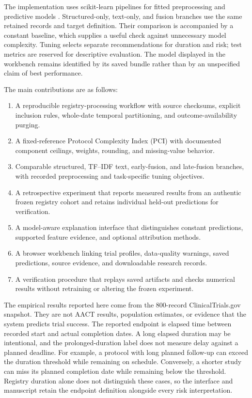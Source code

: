 \documentclass[10pt,letterpaper,twocolumn]{article}
\begin{document}
The implementation uses scikit-learn pipelines for fitted preprocessing and predictive models \cite{sklearn}. Structured-only, text-only, and fusion branches use the same retained records and target definition. Their comparison is accompanied by a constant baseline, which supplies a useful check against unnecessary model complexity. Tuning selects separate recommendations for duration and risk; test metrics are reserved for descriptive evaluation. The model displayed in the workbench remains identified by its saved bundle rather than by an unspecified claim of best performance.

The main contributions are as follows:
\begin{enumerate}
\item A reproducible registry-processing workflow with source checksums, explicit inclusion rules, whole-date temporal partitioning, and outcome-availability purging.
\item A fixed-reference Protocol Complexity Index (PCI) with documented component ceilings, weights, rounding, and missing-value behavior.
\item Comparable structured, TF--IDF text, early-fusion, and late-fusion branches, with recorded preprocessing and task-specific tuning objectives.
\item A retrospective experiment that reports measured results from an authentic frozen registry cohort and retains individual held-out predictions for verification.
\item A model-aware explanation interface that distinguishes constant predictions, supported feature evidence, and optional attribution methods.
\item A browser workbench linking trial profiles, data-quality warnings, saved predictions, source evidence, and downloadable research records.
\item A verification procedure that replays saved artifacts and checks numerical results without retraining or altering the frozen experiment.
\end{enumerate}

The empirical results reported here come from the 800-record ClinicalTrials.gov snapshot. They are not AACT results, population estimates, or evidence that the system predicts trial success. The reported endpoint is elapsed time between recorded start and actual completion dates. A long elapsed duration may be intentional, and the prolonged-duration label does not measure delay against a planned deadline. For example, a protocol with long planned follow-up can exceed the duration threshold while remaining on schedule. Conversely, a shorter study can miss its planned completion date while remaining below the threshold. Registry duration alone does not distinguish these cases, so the interface and manuscript retain the endpoint definition alongside every risk interpretation.
\end{document}
